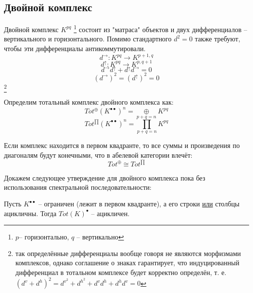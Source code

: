 \documentclass[../main.tex]{subfiles}
\begin{document}
\subsection{Двойной комплекс}
\bee
{}
\eee
\begin{to_def}\label{double_complex}
Двойной комплекс $K^{pq}$ \footnote{$p$-- горизонтально, $q$ -- вертикально} состоит из "матраса" объектов и двух дифференциалов -- вертикального и горизонтального. Помимо стандартного  $d^2=0$ также требуют, чтобы эти дифференциалы антикоммутировали.
\[d^{\rightarrow}\colon K^{pq}\to K^{p+1, q}\]
\[d^{\uparrow}\colon K^{pq}\to K^{p, q+1}\]
\[d^{\rightarrow}d^{\uparrow} + d^{\uparrow}d^{\rightarrow} = 0\]
\[(d^{\rightarrow})^2 = (d^{\uparrow})^2 = 0\]\footnote{так определённые дифференциалы вообще говоря не являются морфизмами комплексов, однако соглашение о знаках гарантирует, что индуцированный дифференциал в тотальном комплексе будет корректно определён, т. е. $(d^v + d^h)^2 = d^v^2 + d^h^2 + d^v d^h + d^h d^v = 0 $}
\end{to_def}
\begin{to_def}
Определим тотальный комплекс двойного комплекса как:
\[Tot^{\oplus}(K^{\bullet\bullet})^n = \underset{p+q=n}{\oplus}K^{pq}\]
\[Tot^{\prod}(K^{\bullet\bullet})^n = \underset{p+q=n}{\prod}K^{pq}\]
\end{to_def}
\begin{to_claim}
Если комплекс находится в первом квадранте, то все суммы и произведения по диагоналям будут конечными, что в абелевой категории влечёт:
\[Tot^{\oplus} \cong Tot^{\prod}\]
\end{to_claim}
Докажем следующее утверждение для двойного комплекса пока без использования спектральной последовательности:
\begin{to_claim}\label{ac_tot}
Пусть $K^{\bullet\bullet}$ -- ограничен (лежит в первом квадранте), а его строки \underline{или} столбцы ацикличны. Тогда $Tot(K)^\bullet$ -- ацикличен.
\end{to_claim}
\end{document}
